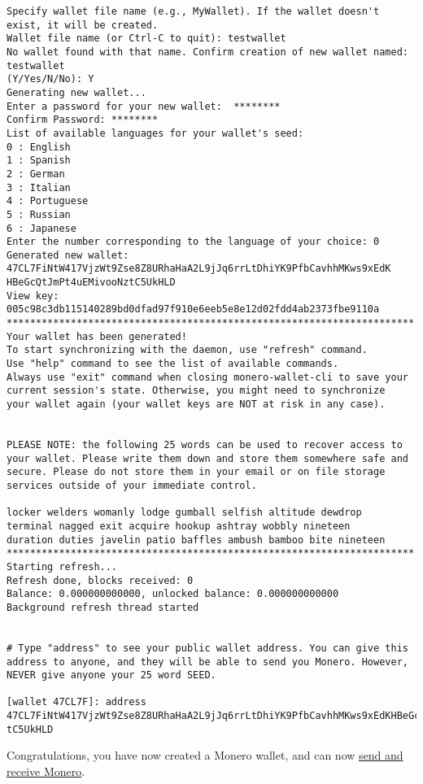 \begin{lstlisting}
Specify wallet file name (e.g., MyWallet). If the wallet doesn't exist, it will be created.
Wallet file name (or Ctrl-C to quit): testwallet
No wallet found with that name. Confirm creation of new wallet named: testwallet
(Y/Yes/N/No): Y
Generating new wallet...
Enter a password for your new wallet:  ********
Confirm Password: ********
List of available languages for your wallet's seed:
0 : English
1 : Spanish
2 : German
3 : Italian
4 : Portuguese
5 : Russian
6 : Japanese
Enter the number corresponding to the language of your choice: 0
Generated new wallet: 47CL7FiNtW417VjzWt9Zse8Z8URhaHaA2L9jJq6rrLtDhiYK9PfbCavhhMKws9xEdK HBeGcQtJmPt4uEMivooNztC5UkHLD
View key: 005c98c3db115140289bd0dfad97f910e6eeb5e8e12d02fdd4ab2373fbe9110a
**********************************************************************
Your wallet has been generated!
To start synchronizing with the daemon, use "refresh" command.
Use "help" command to see the list of available commands.
Always use "exit" command when closing monero-wallet-cli to save your
current session's state. Otherwise, you might need to synchronize
your wallet again (your wallet keys are NOT at risk in any case).


PLEASE NOTE: the following 25 words can be used to recover access to your wallet. Please write them down and store them somewhere safe and secure. Please do not store them in your email or on file storage services outside of your immediate control.

locker welders womanly lodge gumball selfish altitude dewdrop
terminal nagged exit acquire hookup ashtray wobbly nineteen
duration duties javelin patio baffles ambush bamboo bite nineteen
**********************************************************************
Starting refresh...
Refresh done, blocks received: 0
Balance: 0.000000000000, unlocked balance: 0.000000000000
Background refresh thread started


# Type "address" to see your public wallet address. You can give this address to anyone, and they will be able to send you Monero. However, NEVER give anyone your 25 word SEED.

[wallet 47CL7F]: address
47CL7FiNtW417VjzWt9Zse8Z8URhaHaA2L9jJq6rrLtDhiYK9PfbCavhhMKws9xEdKHBeGcQtJmPt4uEMivooNz tC5UkHLD
\end{lstlisting}
Congratulations, you have now created a Monero wallet, and can now \href{https://www.monero.how/tutorial-how-to-send-and-receive-monero-command-line}{send and receive Monero}.

